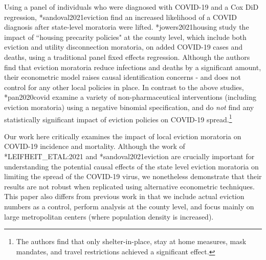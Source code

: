 \documentclass[12pt]{amsart}
\begin{document}
Using a panel of individuals who were diagnosed with COVID-19 and a Cox DiD regression, \citeasnoun**{sandoval2021eviction} find an increased likelihood of a COVID diagnosis after state-level moratoria were lifted. \citeasnoun**{jowers2021housing} study the impact of ``housing precarity policies" at the county level, which include both eviction and utility disconnection moratoria, on added COVID-19 cases and deaths, using a traditional panel fixed effects regression. Although the authors find that eviction moratoria reduce infections and deaths by a significant amount, their econometric model raises causal identification concerns - and does not control for any other local policies in place. In contrast to the above studies, \citeasnoun**{pan2020covid} examine a variety of non-pharmaceutical interventions (including eviction moratoria) using a negative binomial specification, and do \textit{not} find any statistically significant impact of eviction policies on COVID-19 spread.\footnote{The authors find that only shelter-in-place, stay at home measures, mask mandates, and travel restrictions achieved a significant effect.}  

Our work here critically examines the impact of local eviction moratoria on COVID-19 incidence and mortality. Although the work of \citeasnoun**{LEIFHEIT_ETAL:2021} and \citeasnoun**{sandoval2021eviction} are crucially important for understanding the potential causal effects of the state level eviction moratoria on limiting the spread of the COVID-19 virus, we nonetheless demonstrate that their results are not robust when replicated using alternative econometric techniques. This paper also differs from previous work in that we include actual eviction numbers as a control, perform analysis at the county level, and focus mainly on large metropolitan centers (where population density is increased). 

\end{document}
